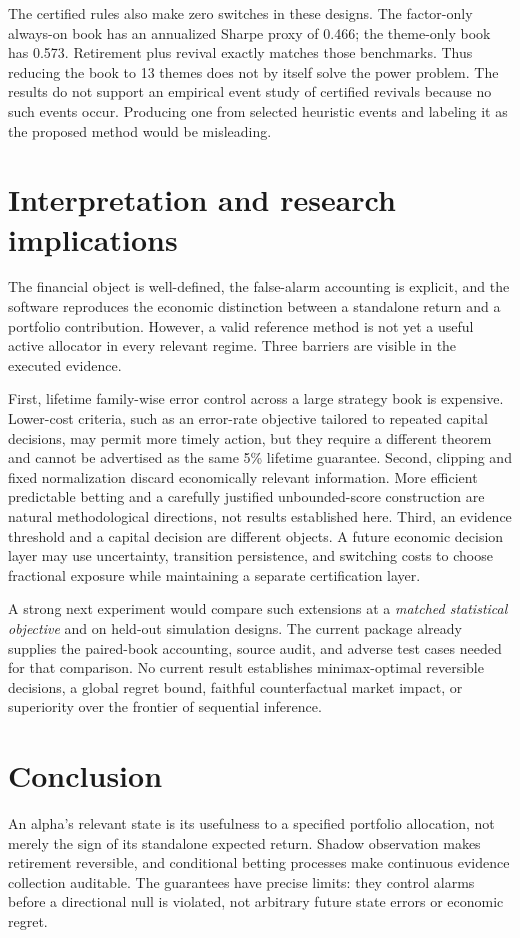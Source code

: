 The certified rules also make zero switches in these designs. The factor-only always-on book has an annualized Sharpe proxy of 0.466; the theme-only book has 0.573. Retirement plus revival exactly matches those benchmarks. Thus reducing the book to 13 themes does not by itself solve the power problem. The results do not support an empirical event study of certified revivals because no such events occur. Producing one from selected heuristic events and labeling it as the proposed method would be misleading.

\section{Interpretation and research implications}
The financial object is well-defined, the false-alarm accounting is explicit, and the software reproduces the economic distinction between a standalone return and a portfolio contribution. However, a valid reference method is not yet a useful active allocator in every relevant regime. Three barriers are visible in the executed evidence.

First, lifetime family-wise error control across a large strategy book is expensive. Lower-cost criteria, such as an error-rate objective tailored to repeated capital decisions, may permit more timely action, but they require a different theorem and cannot be advertised as the same 5\% lifetime guarantee. Second, clipping and fixed normalization discard economically relevant information. More efficient predictable betting and a carefully justified unbounded-score construction are natural methodological directions, not results established here. Third, an evidence threshold and a capital decision are different objects. A future economic decision layer may use uncertainty, transition persistence, and switching costs to choose fractional exposure while maintaining a separate certification layer.

A strong next experiment would compare such extensions at a \emph{matched statistical objective} and on held-out simulation designs. The current package already supplies the paired-book accounting, source audit, and adverse test cases needed for that comparison. No current result establishes minimax-optimal reversible decisions, a global regret bound, faithful counterfactual market impact, or superiority over the frontier of sequential inference.

\section{Conclusion}
An alpha's relevant state is its usefulness to a specified portfolio allocation, not merely the sign of its standalone expected return. Shadow observation makes retirement reversible, and conditional betting processes make continuous evidence collection auditable. The guarantees have precise limits: they control alarms before a directional null is violated, not arbitrary future state errors or economic regret.

